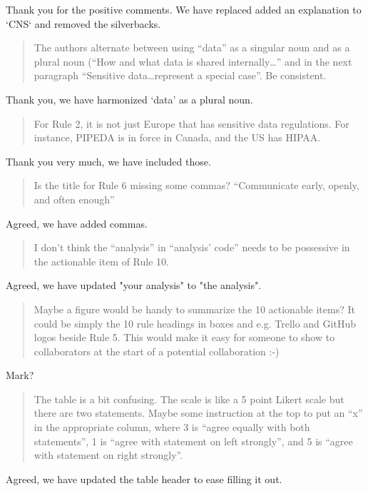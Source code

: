 \documentclass[a4paper]{article}
\begin{document}
Thank you for the positive comments. We have replaced added an explanation to `CNS` and removed the silverbacks.

\begin{quote}
    The authors alternate between using “data” as a singular noun and as a plural noun (“How and what data is shared internally…” and in the next paragraph “Sensitive data…represent a special case”. Be consistent.

\end{quote}

Thank you, we have harmonized `data' as a plural noun.


\begin{quote}
    For Rule 2, it is not just Europe that has sensitive data regulations. For instance, PIPEDA is in force in Canada, and the US has HIPAA.

\end{quote}

Thank you very much, we have included those.

\begin{quote}
    Is the title for Rule 6 missing some commas? “Communicate early, openly, and often enough”

\end{quote}

Agreed, we have added commas.


\begin{quote}
    I don’t think the “analysis” in “analysis’ code” needs to be possessive in the actionable item of Rule 10.

\end{quote}

Agreed, we have updated "your analysis" to "the analysis".

\begin{quote}
    
Maybe a figure would be handy to summarize the 10 actionable items? It could be simply the 10 rule headings in boxes and e.g. Trello and GitHub logos beside Rule 5. This would make it easy for someone to show to collaborators at the start of a potential collaboration :-)

\end{quote}

Mark?

\begin{quote}
    
The table is a bit confusing. The scale is like a 5 point Likert scale but there are two statements. Maybe some instruction at the top to put an “x” in the appropriate column, where 3 is “agree equally with both statements”, 1 is “agree with statement on left strongly”, and 5 is “agree with statement on right strongly”.

\end{quote}

Agreed, we have updated the table header to ease filling it out.
\end{document}
